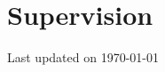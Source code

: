 \documentclass{prometheus_cv}
\begin{document}
\section{Supervision}



%


%


%

\vfill
\begin{center}
	\footnotesize Last updated on \today
\end{center}
\end{document}

